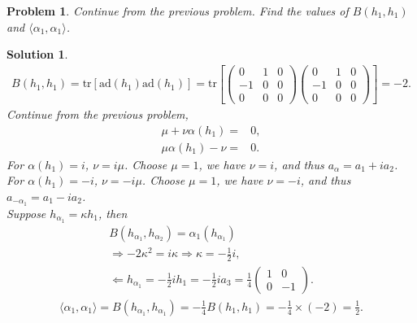 \documentclass[UTF8,10pt,a4paper]{article}
\theoremstyle{Problem}
\newtheorem{prob}{Problem}
\theoremstyle{Solution}
\newtheorem*{sol}{Solution}
\begin{document}
\begin{prob}
    Continue from the previous problem. Find the values of $B(h_1,h_1)$ and $\langle\alpha_1,\alpha_1\rangle$.
\end{prob}
\begin{sol}
    \begin{align}
        B(h_1,h_1)=\text{tr}[\text{ad}(h_1)\text{ad}(h_1)]=\text{tr}\left[\left(\begin{matrix}
            0&1&0\\
            -1&0&0\\
            0&0&0
        \end{matrix}\right)\left(\begin{matrix}
            0&1&0\\
            -1&0&0\\
            0&0&0
        \end{matrix}\right)\right]=-2.
    \end{align}
    Continue from the previous problem,
    \begin{align}
        \mu+\nu\alpha(h_1)=&0,\\
        \mu\alpha(h_1)-\nu=&0.
    \end{align}
    For $\alpha(h_1)=i$, $\nu=i\mu$. Choose $\mu=1$, we have $\nu=i$, and thus $a_{\alpha}=a_1+ia_2$.\\
    For $\alpha(h_1)=-i$, $\nu=-i\mu$. Choose $\mu=1$, we have $\nu=-i$, and thus $a_{-\alpha_1}=a_1-ia_2$.\\
    Suppose $h_{\alpha_1}=\kappa h_1$, then
    \begin{gather}
        B(h_{\alpha_1},h_{\alpha_2})=\alpha_1(h_{\alpha_1})\\
        \Longrightarrow -2\kappa^2=i\kappa\Longrightarrow\kappa=-\frac{1}{2}i,\\
        \Longleftarrow h_{\alpha_1}=-\frac{1}{2}ih_1=-\frac{1}{2}ia_3=\frac{1}{4}\left(\begin{matrix}
            1&0\\
            0&-1
        \end{matrix}\right).
    \end{gather}
    \begin{align}
        \langle\alpha_1,\alpha_1\rangle=B(h_{\alpha_1},h_{\alpha_1})=-\frac{1}{4}B(h_1,h_1)=-\frac{1}{4}\times(-2)=\frac{1}{2}.
    \end{align}
\end{sol}
\end{document}
